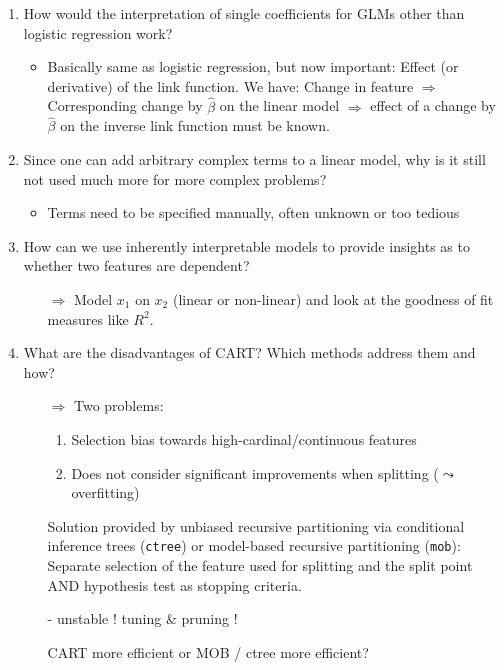 \begin{enumerate}
\begin{itemize}
    	\end{itemize}
        \item How would the interpretation of single coefficients for GLMs other than logistic regression work?
        \begin{itemize}
            \item Basically same as logistic regression, but now important: Effect (or derivative) of the link function.
            We have: Change in feature $\Rightarrow$ Corresponding change by $\hat{\beta}$ on the linear model $\Rightarrow$ effect of a change by $\hat{\beta}$ on the inverse link function must be known.
        \end{itemize}
        \item Since one can add arbitrary complex terms to a linear model, why is it still not used much more for more complex problems?
        \begin{itemize}
            \item Terms need to be specified manually, often unknown or too tedious
        \end{itemize}
    	\item How can we use inherently interpretable models to provide insights as to whether two features are dependent?
    	\begin{itemize}
    		\item[$\Rightarrow$] Model $x_1$ on $x_2$ (linear or non-linear) and look at the goodness of fit measures like $R^2$.
    	\end{itemize}
    	\item What are the disadvantages of CART? Which methods address them and how?
    	\begin{itemize}
    		\item[$\Rightarrow$] Two problems:
    		\begin{enumerate}[1.]
    			\item Selection bias towards high-cardinal/continuous features 
    			\item Does not consider significant improvements when splitting ($\leadsto$ overfitting)
    		\end{enumerate}
    		Solution provided by unbiased recursive partitioning via conditional inference trees (\texttt{ctree}) or model-based recursive partitioning (\texttt{mob}): Separate selection of the feature used for splitting and the split point AND hypothesis test as stopping criteria.

                - unstable !
                tuning \& pruning !
            
                CART more efficient or MOB / ctree more efficient?
    	\end{itemize}
	\end{enumerate}